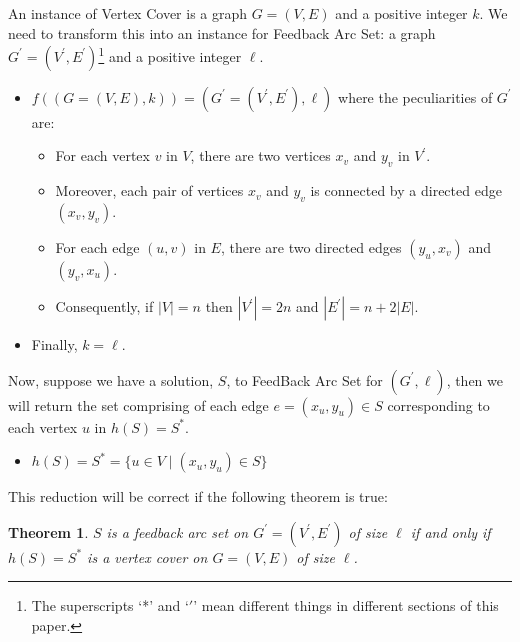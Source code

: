 \documentclass{article}
\newtheorem{theorem}{Theorem}
\begin{document}
An instance of Vertex Cover is a graph $G = (V,E)$ and a positive integer $k$. We need to transform this into an instance for Feedback Arc Set: a graph $G^\prime = (V^\prime , E^\prime)$\footnote{The superscripts `*' and `$\prime$' mean different things in different sections of this paper.} and a positive integer $\ell$.

\begin{itemize}
    \item $f((G = (V,E),k)) = (G^\prime = (V^\prime , E^\prime), \ell)$ where the peculiarities of $G^\prime$ are:
    \begin{itemize}
        \item For each vertex $v$ in $V$, there are two vertices $x_v$ and $y_v$ in $V^\prime$.
        \item Moreover, each pair of vertices $x_v$ and $y_v$ is connected by a directed edge $(x_v,y_v)$. 
        \item For each edge $(u,v)$ in $E$, there are two directed edges $(y_u,x_v)$ and $(y_v,x_u)$.
        \item Consequently, if $|V| = n$ then $|V^\prime| = 2n$ and $|E^\prime| = n + 2|E|$.
    \end{itemize}
    \item Finally, $k = \ell$.
\end{itemize}

Now, suppose we have a solution, $S$, to FeedBack Arc Set for $(G^\prime,\ell)$, then we will return the set comprising of each edge $e=(x_u,y_u) \in S$ corresponding to each vertex $u$ in $h(S) = S^*$.

\begin{itemize}
    \item $h(S) = S^* = \{u \in V\;|\;(x_u,y_u) \in S\}$
\end{itemize}
    
This reduction will be correct if the following theorem is true:

\begin{theorem}
    $S$ is a feedback arc set on $G^\prime = (V^\prime,E^\prime)$ of size $\ell$ if and only if $h(S) = S^*$ is a vertex cover on $G = (V,E)$ of size $\ell$.~\cite{upenn2003}~\cite{toronto2014}
\end{theorem}
    
\end{document}
